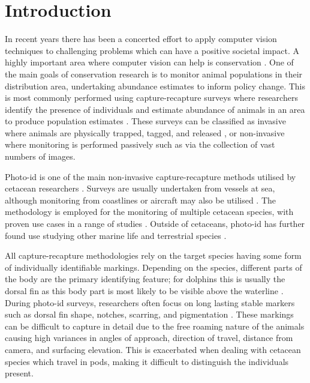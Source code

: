 \chapter{Introduction}\label{ch:intro}


In recent years there has been a concerted effort to apply computer vision techniques to challenging problems which can have a positive societal impact. A highly important area where computer vision can help is conservation \cite{weinstein_computer_2018}. One of the main goals of conservation research is to monitor animal populations in their distribution area, undertaking abundance estimates to inform policy change. This is most commonly performed using capture-recapture surveys where researchers identify the presence of individuals and estimate abundance of animals in an area to produce population estimates \cite{constantine_abundance_2012, bigg_assessment_1982, sharpe_indian_2019, van_bressem_visual_2018, arso_civil_changing_2019, cheney_long-term_2014}. These surveys can be classified as invasive where animals are physically trapped, tagged, and released \cite{norris_tagging_1970, hobbs_bowhead_1982, andrews_best_2019}, or non-invasive where monitoring is performed passively such as via the collection of vast numbers of images. 

Photo-id is one of the main non-invasive capture-recapture methods utilised by cetacean researchers \cite{hammond_individual_1990, evans_monitoring_2004}. Surveys are usually undertaken from vessels at sea, although monitoring from coastlines or aircraft may also be utilised \cite{payne_long_1986, forney_seasonal_1998, wursig_methods_1990}. The methodology is employed for the monitoring of multiple cetacean species, with proven use cases in a range of studies \cite{sharpe_indian_2019, miragliuolo_rissos_2004, feyrer_origin_2021, bigg_assessment_1982}. Outside of cetaceans, photo-id has further found use studying other marine life \cite{holmberg_estimating_2009, reisser_photographic_2008} and terrestrial species \cite{goswami_application_2007, clapham_automated_2020}.

All capture-recapture methodologies rely on the target species having some form of individually identifiable markings. Depending on the species, different parts of the body are the primary identifying feature; for dolphins this is usually the dorsal fin as this body part is most likely to be visible above the waterline \cite{sharpe_indian_2019, baird_population_2009}. During photo-id surveys, researchers often focus on long lasting stable markers such as dorsal fin shape, notches, scarring, and pigmentation \cite{wursig_photographic_1977, lockyer_observations_1990, mann_cetacean_2000}. These markings can be difficult to capture in detail due to the free roaming nature of the animals causing high variances in angles of approach, direction of travel, distance from camera, and surfacing elevation. This is exacerbated when dealing with cetacean species which travel in pods, making it difficult to distinguish the individuals present.

